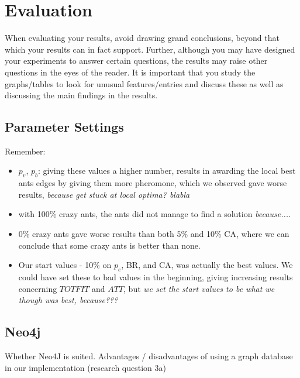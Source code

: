 \section{Evaluation}

When evaluating your results, avoid drawing grand conclusions, beyond that which your results can in fact support. Further, although you may have designed your experiments to answer certain questions, the results may raise other questions in the eyes of the reader. It is important that you study the graphs/tables to look for unusual features/entries and discuss these as well as discussing the main findings in the results. 

\subsection{Parameter Settings}
Remember:
\begin{itemize}
\item $p_v$, $p_b$: giving these values a higher number, results in awarding the local best ants edges by giving them more pheromone, which we observed gave worse results, \emph{\color{red}because get stuck at local optima? blabla}
\item with 100\% crazy ants, the ants did not manage to find a solution \emph{\color{red}because...}. 
\item 0\% crazy ants gave worse results than both 5\% and 10\% CA, where we can conclude that some crazy ants is better than none. 
\item Our start values - 10\% on $p_e$, BR, and CA, was actually the best values. We could have set these to bad values in the beginning, giving increasing results concerning $TOTFIT$ and $ATT$, but \emph{\color{red} we set the start values to be what we though was best, because???}
\end{itemize}

\subsection{Neo4j}

Whether Neo4J is suited. Advantages / disadvantages of using a graph database in our implementation (research question 3a)